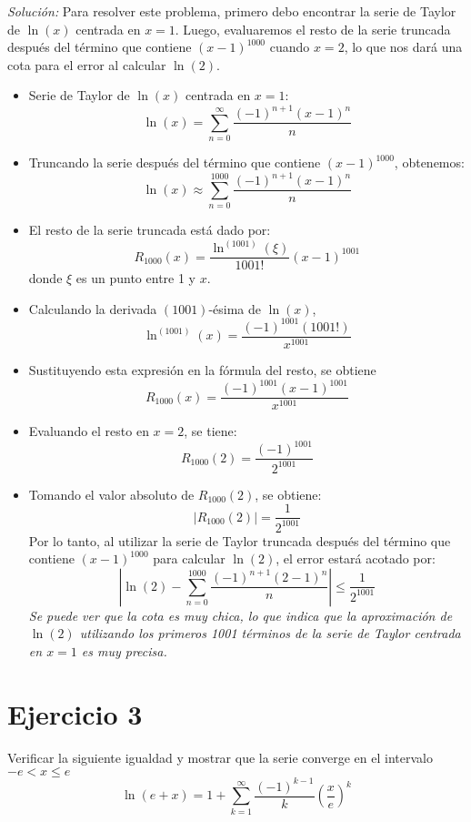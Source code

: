 \documentclass{article}
\newenvironment{solution}
    {\textit{Solución:}}
    {}
\begin{document}
\begin{solution}
    Para resolver este problema, primero debo encontrar la serie de Taylor de $\ln(x)$ centrada en $x = 1$. Luego, evaluaremos el resto de la serie truncada después del término que contiene $(x - 1)^{1000}$ cuando $x = 2$, lo que nos dará una cota para el error al calcular $\ln(2)$.
    \begin{itemize}
        \item Serie de Taylor de $\ln(x)$ centrada en $x = 1$:
        $$\ln(x) = \sum_{n=0}^\infty \frac{(-1)^{n+1}(x-1)^n}{n}$$
        \item Truncando la serie después del término que contiene $(x - 1)^{1000}$, obtenemos:
        $$\ln(x) \approx \sum_{n=0}^{1000} \frac{(-1)^{n+1}(x-1)^n}{n}$$
        \item El resto de la serie truncada está dado por:
        $$R_{1000}(x) = \frac{\ln^{(1001)}(\xi)}{1001!}(x-1)^{1001}$$
        donde $\xi$ es un punto entre 1 y $x$.
        \item Calculando la derivada $(1001)$-ésima de $\ln(x)$,
        $$\ln^{(1001)}(x) = \frac{(-1)^{1001}(1001!)}{{x}^{1001}}$$
        \item Sustituyendo esta expresión en la fórmula del resto, se obtiene
        $$R_{1000}(x) = \frac{(-1)^{1001}(x-1)^{1001}}{{x}^{1001}}$$
        \item Evaluando el resto en $x = 2$, se tiene:
        $$R_{1000}(2) = \frac{(-1)^{1001}}{2^{1001}}$$
        \item Tomando el valor absoluto de $R_{1000}(2)$, se obtiene:
        $$|R_{1000}(2)| = \frac{1}{2^{1001}}$$
        Por lo tanto, al utilizar la serie de Taylor truncada después del término que contiene $(x - 1)^{1000}$ para calcular $\ln(2)$, el error estará acotado por:
        $$\left|\ln(2) - \sum_{n=0}^{1000} \frac{(-1)^{n+1}(2-1)^n}{n}\right| \leq \frac{1}{2^{1001}}$$
        \textit{Se puede ver que la cota es muy chica, lo que indica que la aproximación de $\ln(2)$ utilizando los primeros 1001 términos de la serie de Taylor centrada en $x = 1$ es muy precisa.}
    \end{itemize}
\end{solution}

\newpage
\section*{Ejercicio 3}
Verificar la siguiente igualdad y mostrar que la serie converge en el intervalo $-e < x \leq e$
\begin{equation*}
    \ln(e+x) = 1 + \sum_{k=1}^\infty \frac{(-1)^{k-1}}{k}\left( \frac{x}{e} \right)^k
\end{equation*}
\end{document}
